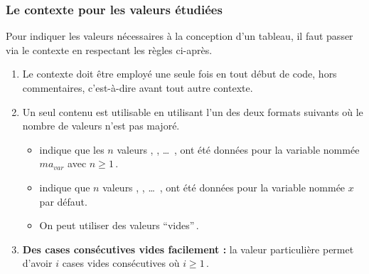 \documentclass{tutodoc}
\begin{document}

\subsubsection{Le contexte  pour les valeurs étudiées}
\label{tns-math-functab-dsl-l3-ctxt-xvals}

Pour indiquer les valeurs nécessaires à la conception d'un tableau, il faut passer via le contexte  en respectant les règles ci-après.
%
\begin{enumerate}
    \item Le contexte  doit être employé une seule fois en tout début de code, hors commentaires, c'est-à-dire avant tout autre contexte.


    \item Un seul contenu est utilisable en utilisant l'un des deux formats suivants où le nombre de valeurs n'est pas majoré.
    \begin{itemize}
        \item {} indique que les $n$ valeurs  ,  , \dots\ ,  ont été données pour la variable nommée $ma_{var}$ avec $n \geq 1$\,.

        \item {} indique que $n$ valeurs  ,  , \dots\ ,  ont été données pour la variable nommée $x$ par défaut.

        \item On peut utiliser des valeurs \enquote{vides}\,.
    \end{itemize}


    \item \textbf{Des cases consécutives vides facilement :} la valeur particulière  permet d'avoir $i$ cases vides consécutives où $i \geq 1$\,.
\end{enumerate}


\medskip
\end{document}
